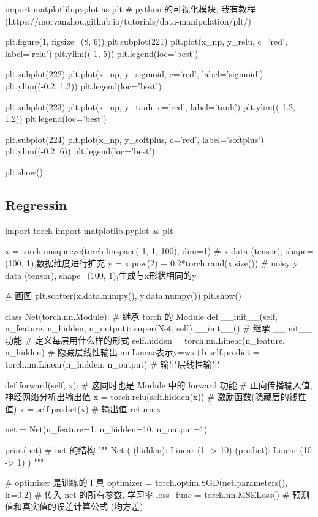 \documentclass{article}
\begin{document}
\begin{python}
\begin{python}
		import matplotlib.pyplot as plt  # python 的可视化模块, 我有教程 (https://morvanzhou.github.io/tutorials/data-manipulation/plt/)
		
		plt.figure(1, figsize=(8, 6))
		plt.subplot(221)
		plt.plot(x_np, y_relu, c='red', label='relu')
		plt.ylim((-1, 5))
		plt.legend(loc='best')
		
		plt.subplot(222)
		plt.plot(x_np, y_sigmoid, c='red', label='sigmoid')
		plt.ylim((-0.2, 1.2))
		plt.legend(loc='best')
		
		plt.subplot(223)
		plt.plot(x_np, y_tanh, c='red', label='tanh')
		plt.ylim((-1.2, 1.2))
		plt.legend(loc='best')
		
		plt.subplot(224)
		plt.plot(x_np, y_softplus, c='red', label='softplus')
		plt.ylim((-0.2, 6))
		plt.legend(loc='best')
		
		plt.show()
	\end{python}
	\subsection{Regressin}
	\begin{python}
		import torch
		import matplotlib.pyplot as plt
		
		x = torch.unsqueeze(torch.linspace(-1, 1, 100), dim=1)  \# x data (tensor), shape=(100, 1),数据维度进行扩充
		y = x.pow(2) + 0.2*torch.rand(x.size())                 \# noisy y data (tensor), shape=(100, 1),生成与x形状相同的y
		
		\# 画图
		plt.scatter(x.data.numpy(), y.data.numpy())
		plt.show()
		
		class Net(torch.nn.Module):  \# 继承 torch 的 Module
		def \_\_init\_\_(self, n\_feature, n\_hidden, n\_output):
		super(Net, self).\_\_init\_\_()     \# 继承 \_\_init\_\_ 功能
		\# 定义每层用什么样的形式
		self.hidden = torch.nn.Linear(n\_feature, n\_hidden)   \# 隐藏层线性输出,nn.Linear表示y=wx+b
		self.predict = torch.nn.Linear(n\_hidden, n\_output)   \# 输出层线性输出
		
		def forward(self, x):   \# 这同时也是 Module 中的 forward 功能
		\# 正向传播输入值, 神经网络分析出输出值
		x = torch.relu(self.hidden(x))      \# 激励函数(隐藏层的线性值)
		x = self.predict(x)             \# 输出值
		return x
		
		net = Net(n\_feature=1, n\_hidden=10, n\_output=1)
		
		print(net)  \# net 的结构
		"""
		Net (
		(hidden): Linear (1 -> 10)
		(predict): Linear (10 -> 1)
		)
		"""
		
		\# optimizer 是训练的工具
		optimizer = torch.optim.SGD(net.parameters(), lr=0.2)  \# 传入 net 的所有参数, 学习率
		loss\_func = torch.nn.MSELoss()      \# 预测值和真实值的误差计算公式 (均方差)
		

\end{python}
\end{python}
\end{document}

